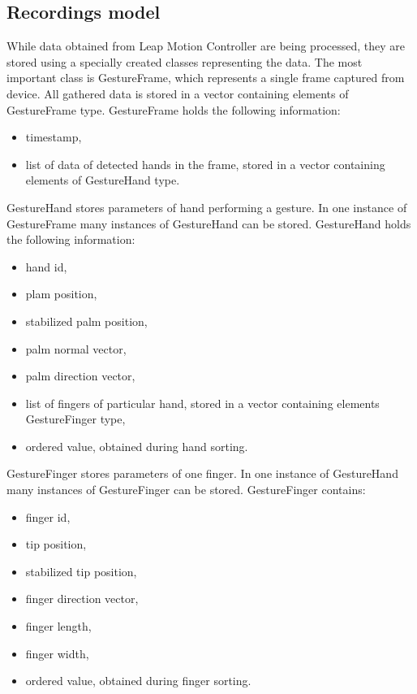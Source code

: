 \subsection{Recordings model}\label{modelSubsection}

While data obtained from Leap Motion Controller are being processed, they are stored using a specially created classes representing the data. The most important class is GestureFrame, which represents a single frame captured from device. All gathered data is stored in a vector containing elements of GestureFrame type. GestureFrame holds the following information:

\begin{itemize}
\item timestamp,
\item list of data of detected hands in the frame, stored in a vector containing elements of GestureHand type.
\end{itemize}

GestureHand stores parameters of hand performing a gesture. In one instance of GestureFrame many instances of GestureHand can be stored. GestureHand holds the following information:
\begin{itemize}
\item hand id,
\item plam position,
\item stabilized palm position,
\item palm normal vector,
\item palm direction vector,
\item list of fingers of particular hand, stored in a vector containing elements GestureFinger type,
\item ordered value, obtained during hand sorting.
\end{itemize}

GestureFinger stores parameters of one finger. In one instance of GestureHand many instances of GestureFinger can be stored. GestureFinger contains:
\begin{itemize}
\item finger id,
\item tip position,
\item stabilized tip position,
\item finger direction vector,
\item finger length,
\item finger width,
\item ordered value, obtained during finger sorting.
\end{itemize}

